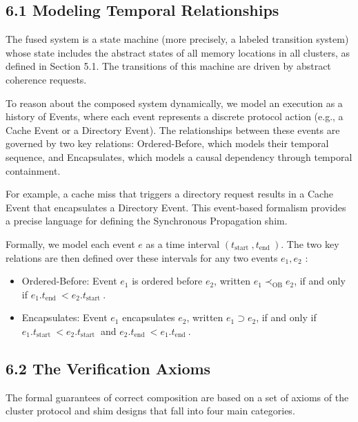 \documentclass[10pt]{article}
\begin{document}
\subsection*{6.1 Modeling Temporal Relationships}
The fused system is a state machine (more precisely, a labeled transition system) whose state includes the abstract states of all memory locations in all clusters, as defined in Section 5.1. The transitions of this machine are driven by abstract coherence requests.

To reason about the composed system dynamically, we model an execution as a history of Events, where each event represents a discrete protocol action (e.g., a Cache Event or a Directory Event). The relationships between these events are governed by two key relations: Ordered-Before, which models their temporal sequence, and Encapsulates, which models a causal dependency through temporal containment.

For example, a cache miss that triggers a directory request results in a Cache Event that encapsulates a Directory Event. This event-based formalism provides a precise language for defining the Synchronous Propagation shim.

Formally, we model each event $e$ as a time interval $\left(t_{\text {start }}, t_{\text {end }}\right)$. The two key relations are then defined over these intervals for any two events $e_{1}, e_{2}$ :

\begin{itemize}
  \item[-] Ordered-Before: Event $e_{1}$ is ordered before $e_{2}$, written $e_{1} \prec_{\mathrm{OB}} e_{2}$, if and only if $e_{1} . t_{\text {end }}<e_{2} . t_{\text {start }}$.
  \item[-] Encapsulates: Event $e_{1}$ encapsulates $e_{2}$, written $e_{1} \supset e_{2}$, if and only if $e_{1} . t_{\text {start }}<e_{2} . t_{\text {start }}$ and $e_{2} . t_{\text {end }}<e_{1} . t_{\text {end }}$.
\end{itemize}

\subsection*{6.2 The Verification Axioms}
The formal guarantees of correct composition are based on a set of axioms of the cluster protocol and shim designs that fall into four main categories.
\end{document}
